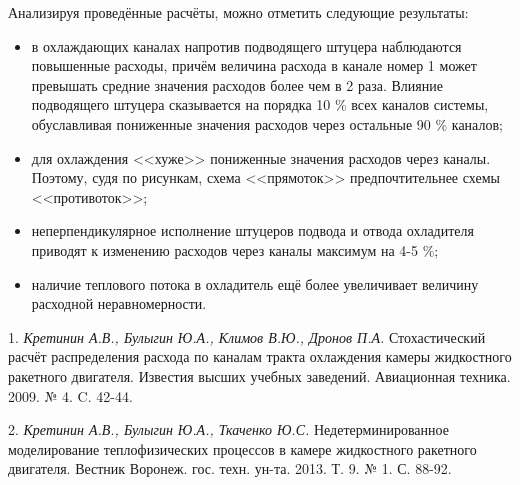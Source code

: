 Анализируя проведённые расчёты, можно отметить следующие результаты:
\begin{itemize}
	\item
	в охлаждающих каналах напротив подводящего штуцера наблюдаются повышенные расходы,
	причём величина расхода в канале номер 1 может превышать средние значения расходов более чем в 2 раза.
	\linebreak
	Влияние подводящего штуцера сказывается на порядка 10 $\%$ всех каналов системы, обуславливая пониженные значения расходов через остальные 90 $\%$ каналов;

	\item
	для охлаждения <<хуже>> пониженные значения расходов через каналы. Поэтому, судя по рисункам, схема <<прямоток>> предпочтительнее схемы <<противоток>>;

	\item
	неперпендикулярное исполнение штуцеров подвода и отвода охладителя приводят к изменению расходов через каналы максимум на 4-5 $\%$;

	\item
	наличие теплового потока в охладитель ещё более увеличивает величину расходной неравномерности.
\end{itemize}

\litlist

1. {\it Кретинин А.В., Булыгин Ю.А., Климов В.Ю., Дронов П.А.} Стохастический расчёт распределения расхода по каналам тракта охлаждения камеры жидкостного ракетного двигателя. Известия высших учебных заведений. Авиационная техника. 2009. № 4. C. 42-44.

2. {\it Кретинин А.В., Булыгин Ю.А., Ткаченко Ю.С.} Недетерминированное моделирование теплофизических процессов в камере жидкостного ракетного двигателя. Вестник Воронеж. гос. техн. ун-та. 2013. Т. 9. № 1. С. 88-92.

